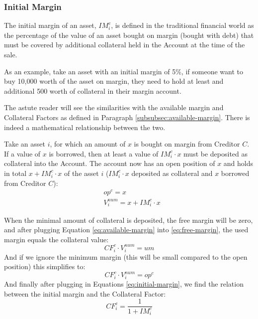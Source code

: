 \documentclass[sigconf,nonacm]{acmart}
\begin{document}
\subsubsection{Initial Margin}
\label{subsubsec:initial-margin}
The initial margin of an asset, $IM_{i}^{c}$, is defined in the traditional financial world as the percentage of the value of an asset bought on margin (bought with debt)
that must be covered by additional collateral held in the Account at the time of the sale.

As an example, take an asset with an initial margin of 5\%, if someone want to buy 10,000 worth of the asset on margin,
they need to hold at least and additional 500 worth of collateral in their margin account.

The astute reader will see the similarities with the available margin and Collateral Factors as defined in Paragraph \ref{subsubsec:available-margin}.
There is indeed a mathematical relationship between the two.

Take an asset $i$, for which an amount of $x$ is bought on margin from Creditor $C$.
If a value of $x$ is borrowed, then at least a value of $IM_{i}^{c} \cdot x$ must be deposited as collateral into the Account.
The account now has an open position of $x$ and holds in total $x + IM_{i}^{c} \cdot x$ of the asset $i$ ($IM_{i}^{c} \cdot x$ deposited as collateral and $x$ borrowed from Creditor $C$):
\begin{equation}
    \label{eq:initial-margin}
    \begin{split}
        &op^c = x\\
        &V^{num}_i = x + IM_{i}^{c} \cdot x
    \end{split}
\end{equation}

When the minimal amount of collateral is deposited, the free margin will be zero, and after plugging Equation \ref{eq:available-margin} into \ref{eq:free-margin}, the used margin equals the collateral value:
\begin{equation}
    CF_{i}^{c} \cdot V^{num}_i = um
\end{equation}
And if we ignore the minimum margin (this will be small compared to the open position) this simplifies to:
\begin{equation}
    CF_{i}^{c} \cdot V^{num}_i = op^c
\end{equation}
And finally after plugging in Equations \ref{eq:initial-margin}, we find the relation between the initial margin and the Collateral Factor:
\begin{equation}
    CF_{i}^{c} = \frac{1}{1 + IM_{i}^{c}}
\end{equation}
\end{document}
